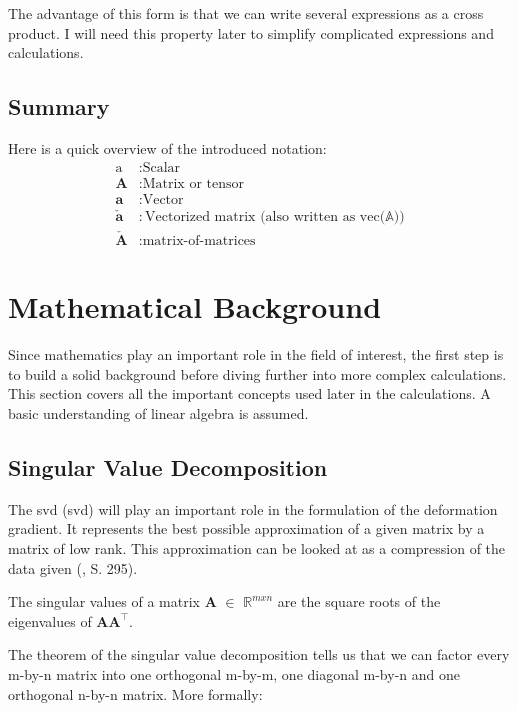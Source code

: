 The advantage of this form is that we can write several expressions as a cross product. I will need this property later to simplify complicated expressions and calculations.


\subsection{Summary}
Here is a quick overview of the introduced notation:
\begin{align*}
\text{a}&: \text{Scalar} \\
\mathbf{A}&: \text{Matrix or tensor} \\
\mathbf{a}&: \text{Vector} \\
\mathbf{\check{a}}&: \text{Vectorized matrix (also written as vec($\mathbb{A}$))} \\
\mathbf{\check{A}}&: \text{matrix-of-matrices}
\end{align*}


\section{Mathematical Background}
Since mathematics play an important role in the field of interest, the first step is to build a solid background before diving further into more complex calculations. This section covers all the important concepts used later in the calculations. A basic understanding of linear algebra is assumed.

\subsection{Singular Value Decomposition}

The \acrlong{svd} (\acrshort{svd}) will play an important role in the formulation of the deformation gradient. It represents the best possible approximation of a given matrix by a matrix of low rank. This approximation can be looked at as a compression of the data given (\cite{LiesenMehrmann2015}, S. 295).

\begin{definition}
\label{singular_values}
The singular values of a matrix $\mathbf{A}$ $\in$ $\mathbb{R}^{m x n}$ are the square roots of the eigenvalues of $\mathbf{AA}^{\intercal}$.
\end{definition}

The theorem of the singular value decomposition tells us that we can factor every m-by-n matrix into one orthogonal m-by-m, one diagonal m-by-n and one orthogonal n-by-n matrix. More formally:

